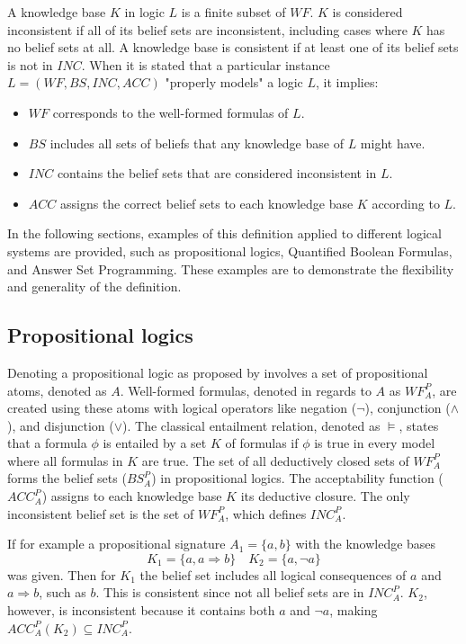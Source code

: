 A knowledge base \(K\) in logic \(L\) is a finite subset of \(WF\).
\(K\) is considered inconsistent if all of its belief sets are inconsistent, including cases where \(K\) has no belief sets at all.
A knowledge base is consistent if at least one of its belief sets is not in \(INC\).
When it is stated that a particular instance \(L = (WF, BS, INC, ACC)\) "properly models" a logic \(L\), it implies:
\begin{itemize}
      \item \(WF\) corresponds to the well-formed formulas of \(L\).
      \item \(BS\) includes all sets of beliefs that any knowledge base of \(L\) might have.
      \item \(INC\) contains the belief sets that are considered inconsistent in \(L\).
      \item \(ACC\) assigns the correct belief sets to each knowledge base \(K\) according to \(L\).
\end{itemize}

In the following sections, examples of this definition applied to different logical systems are provided, such as propositional logics, Quantified Boolean Formulas, and Answer Set Programming.
These examples are to demonstrate the flexibility and generality of the definition.

\subsection{Propositional logics}
Denoting a propositional logic as proposed by \cite{gelfond_classical_1991} involves a set of propositional atoms, denoted as \(A\).
Well-formed formulas, denoted in regards to \(A\) as \(WF^P_A\), are created using these atoms with logical operators like negation (\(\neg\)), conjunction (\(\land\)), and disjunction (\(\lor\)).
The classical entailment relation, denoted as \(\models\), states that a formula \(\phi\) is entailed by a set \(K\) of formulas if \(\phi\) is true in every model where all formulas in \(K\) are true.
The set of all deductively closed sets of \(WF^P_A\) forms the belief sets (\(BS^P_A\)) in propositional logics.
The acceptability function (\(ACC^P_A\)) assigns to each knowledge base \(K\) its deductive closure.
The only inconsistent belief set is the set of \(WF^P_A\), which defines \(INC^P_A\).

If for example a propositional signature \(A_1 = \{a,b\}\) with the knowledge bases
\[K_1 = \{a, a \Rightarrow b\} \quad K_2 = \{a, \neg a\}\]
was given.
Then for \(K_1\) the belief set includes all logical consequences of \(a\) and \(a \Rightarrow b\), such as \(b\).
This is consistent since not all belief sets are in \(INC^P_A\).
\(K_2\), however, is inconsistent because it contains both \(a\) and \(\neg a\), making \(ACC^P_A(K_2) \subseteq INC^P_A\).

